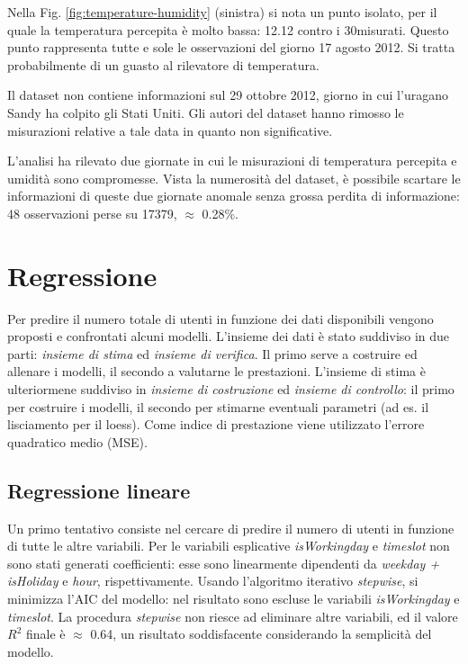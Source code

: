 \documentclass[a4paper, 10pt]{report}
\begin{document}
Nella Fig. \ref{fig:temperature-humidity} (sinistra) si nota un punto
isolato, per il quale la temperatura percepita è molto bassa: 12.12\degree
contro i 30\degree misurati. Questo punto rappresenta tutte e sole le
osservazioni del giorno 17 agosto 2012. Si tratta probabilmente di un
guasto al rilevatore di temperatura.

Il dataset non contiene informazioni sul 29 ottobre 2012, giorno in cui
l'uragano Sandy ha colpito gli Stati Uniti. Gli autori del dataset hanno
rimosso le misurazioni relative a tale data in quanto non significative.

L'analisi ha rilevato due giornate in cui le misurazioni di temperatura
percepita e umidità sono compromesse. Vista la numerosità del dataset,
è possibile scartare le informazioni di queste due giornate anomale
senza grossa perdita di informazione: 48 osservazioni perse su 17379,
$\approx$ 0.28\%.



\chapter{Regressione}
\label{cap:regression}
Per predire il numero totale di utenti in funzione dei dati disponibili
vengono proposti e confrontati alcuni modelli. L'insieme dei dati è
stato suddiviso in due parti: \emph{insieme di stima} ed \emph{insieme
di verifica}. Il primo serve a costruire ed allenare i modelli, il
secondo a valutarne le prestazioni. L'insieme di stima è ulteriormene
suddiviso in \emph{insieme di costruzione} ed \emph{insieme di controllo}:
il primo per costruire i modelli, il secondo per stimarne eventuali parametri
(ad es. il lisciamento per il loess). Come indice di prestazione viene
utilizzato l'errore quadratico medio (MSE).


\section{Regressione lineare}
Un primo tentativo consiste nel cercare di predire il numero di utenti
in funzione di tutte le altre variabili. Per le variabili esplicative
\emph{isWorkingday} e \emph{timeslot} non sono stati generati coefficienti:
esse sono linearmente dipendenti da \emph{weekday + isHoliday} e \emph{hour},
rispettivamente. Usando l'algoritmo iterativo \emph{stepwise}, si minimizza
l'AIC del modello: nel risultato sono escluse le variabili \emph{isWorkingday}
e \emph{timeslot}. La procedura \emph{stepwise} non riesce ad eliminare
altre variabili, ed il valore $R^{2}$ finale è $\approx$ 0.64, un risultato
soddisfacente considerando la semplicità del modello.
\end{document}
